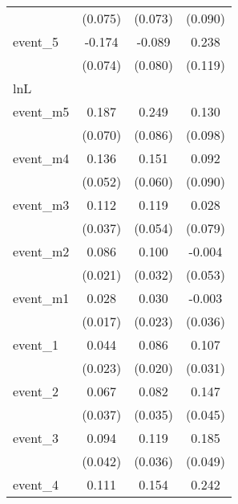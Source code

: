 {\begin{tabular}{l*{3}{c}}
            &     (0.075)         &     (0.073)         &     (0.090)         \\
[1em]
event\_5     &      -0.174\sym{*}  &      -0.089         &       0.238\sym{*}  \\
            &     (0.074)         &     (0.080)         &     (0.119)         \\
\hline
lnL         &                     &                     &                     \\
event\_m5    &       0.187\sym{**} &       0.249\sym{**} &       0.130         \\
            &     (0.070)         &     (0.086)         &     (0.098)         \\
[1em]
event\_m4    &       0.136\sym{**} &       0.151\sym{*}  &       0.092         \\
            &     (0.052)         &     (0.060)         &     (0.090)         \\
[1em]
event\_m3    &       0.112\sym{**} &       0.119\sym{*}  &       0.028         \\
            &     (0.037)         &     (0.054)         &     (0.079)         \\
[1em]
event\_m2    &       0.086\sym{***}&       0.100\sym{**} &      -0.004         \\
            &     (0.021)         &     (0.032)         &     (0.053)         \\
[1em]
event\_m1    &       0.028         &       0.030         &      -0.003         \\
            &     (0.017)         &     (0.023)         &     (0.036)         \\
[1em]
event\_1     &       0.044         &       0.086\sym{***}&       0.107\sym{***}\\
            &     (0.023)         &     (0.020)         &     (0.031)         \\
[1em]
event\_2     &       0.067         &       0.082\sym{*}  &       0.147\sym{**} \\
            &     (0.037)         &     (0.035)         &     (0.045)         \\
[1em]
event\_3     &       0.094\sym{*}  &       0.119\sym{**} &       0.185\sym{***}\\
            &     (0.042)         &     (0.036)         &     (0.049)         \\
[1em]
event\_4     &       0.111         &       0.154\sym{**} &       0.242\sym{***}\\

\end{tabular}}
